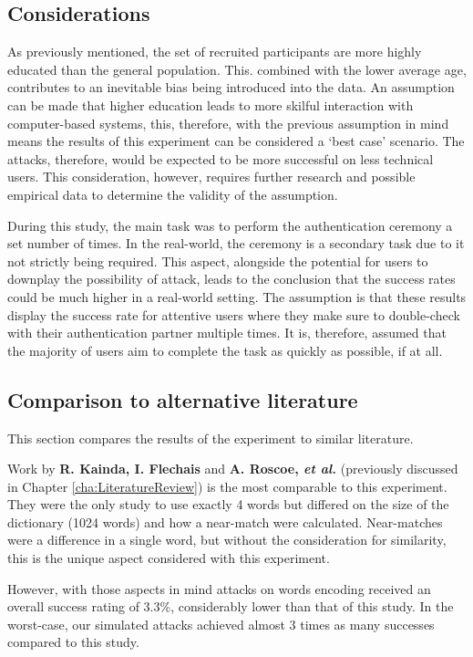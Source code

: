 \subsection*{Considerations}
As previously mentioned, the set of recruited participants are more highly educated than the general population. This. combined with the lower average age, contributes to an inevitable bias being introduced into the data. An assumption can be made that higher education leads to more skilful interaction with computer-based systems, this, therefore, with the previous assumption in mind means the results of this experiment can be considered a `best case' scenario. The attacks, therefore, would be expected to be more successful on less technical users. This consideration, however, requires further research and possible empirical data to determine the validity of the assumption. 

During this study, the main task was to perform the authentication ceremony a set number of times. In the real-world, the ceremony is a secondary task due to it not strictly being required. This aspect, alongside the potential for users to downplay the possibility of attack, leads to the conclusion that the success rates could be much higher in a real-world setting. The assumption is that these results display the success rate for attentive users where they make sure to double-check with their authentication partner multiple times. It is, therefore, assumed that the majority of users aim to complete the task as quickly as possible, if at all.

\subsection*{Comparison to alternative literature}
This section compares the results of the experiment to similar literature.

Work by \textbf{R. Kainda, I. Flechais} and \textbf{A. Roscoe, \textit{et al.}}\cite{kainda2009usability} (previously discussed in Chapter \ref{cha:LiteratureReview}) is the most comparable to this experiment. They were the only study to use exactly 4 words but differed on the size of the dictionary (1024 words) and how a near-match were calculated. Near-matches were a difference in a single word, but without the consideration for similarity, this is the unique aspect considered with this experiment.

However, with those aspects in mind attacks on words encoding received an overall success rating of 3.3\%, considerably lower than that of this study. In the worst-case, our simulated attacks achieved almost 3 times as many successes compared to this study.

